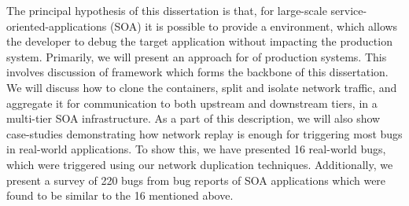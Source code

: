 \begin{comment}
Further, we look towards analysis for guided debugging in a live debugging environment as created in \parikshan.
We explain the debugging workflow from an end-to-end basis for an application debugger.
First we try and briefly answer how existing approaches can be used to localize the components that need to be cloned, using readily available log information.
We look into our earlier work called \textit{CLUE}\cite{clue} where we have explored systematically pointing potentially faulty components by looking at system call logs.
We also show other works, which look at existing available transaction and error logs, which can be used to find error traces, and localize buggy components.
Next, we explore the concept of \textit{debugging windows} in \parikshan, which signify the length of time till which the cloned containers faithfully follow the original production application.
We discuss how we can track, and predict the window sizes, and the amount of instrumentation budget that the debugger can employ, without causing a debug window collapse.
Finally, we look at new debugging analytics which can be used with \parikshan.
We take inspiration from existing work in adaptive statistical profiling, speculative and delta-debugging techniques to generate traces with good and bad behavior.
We show how automated debugging in \parikshan can greatly simplify the debugging process\
We also look into how to make applications \parikshan ready, by adding ready to instrument hooks in the application code.
In this context, we discuss \iprobe, a novel dynamic instrumentation technique, which allows for patching and instrumentation at runtime.
\iprobe has a significant performance advantage on existing techniques, which use interrupt based mechanisms to insert trampolines for instrumentation in the kernel code.
\end{comment}

The principal hypothesis of this dissertation is that, for large-scale service-oriented-applications (SOA) it is possible to provide a \livedebugging environment, which allows the developer to debug the target application without impacting the production system.
Primarily, we will present an approach for \livedebugging of production systems.
This involves discussion of \parikshan framework which forms the backbone of this dissertation.
We will discuss how to clone the containers, split and isolate network traffic, and aggregate it for communication to both upstream and downstream tiers, in a multi-tier SOA infrastructure.
As a part of this description, we will also show case-studies demonstrating how network replay is enough for triggering most bugs in real-world applications. 
To show this, we have presented 16 real-world bugs, which were triggered using our network duplication techniques. 
Additionally, we present a survey of 220 bugs from bug reports of SOA applications which were found to be similar to the 16 mentioned above.


